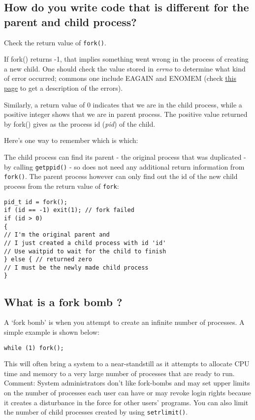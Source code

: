 \subsection{How do you write code that is different for the parent and
child
process?}\label{how-do-you-write-code-that-is-different-for-the-parent-and-child-process}

Check the return value of \texttt{fork()}.

If fork() returns -1, that implies something went wrong in the process
of creating a new child. One should check the value stored in
\emph{errno} to determine what kind of error occurred; commons one
include EAGAIN and ENOMEM (check
\href{http://www-numi.fnal.gov/offline_software/srt_public_context/WebDocs/Errors/unix_system_errors.html}{this
page} to get a description of the errors).

Similarly, a return value of 0 indicates that we are in the child
process, while a positive integer shows that we are in parent process.
The positive value returned by fork() gives as the process id
(\emph{pid}) of the child.

Here's one way to remember which is which:

The child process can find its parent - the original process that was
duplicated - by calling \texttt{getppid()} - so does not need any
additional return information from \texttt{fork()}. The parent process
however can only find out the id of the new child process from the
return value of \texttt{fork}:

\begin{verbatim}
pid_t id = fork();
if (id == -1) exit(1); // fork failed 
if (id > 0)
{ 
// I'm the original parent and 
// I just created a child process with id 'id'
// Use waitpid to wait for the child to finish
} else { // returned zero
// I must be the newly made child process
}
\end{verbatim}

\subsection{What is a fork bomb ?}\label{what-is-a-fork-bomb}

A `fork bomb' is when you attempt to create an infinite number of
processes. A simple example is shown below:

\begin{verbatim}
while (1) fork();
\end{verbatim}

This will often bring a system to a near-standstill as it attempts to
allocate CPU time and memory to a very large number of processes that
are ready to run. Comment: System administrators don't like fork-bombs
and may set upper limits on the number of processes each user can have
or may revoke login rights because it creates a disturbance in the force
for other users' programs. You can also limit the number of child
processes created by using \texttt{setrlimit()}.


